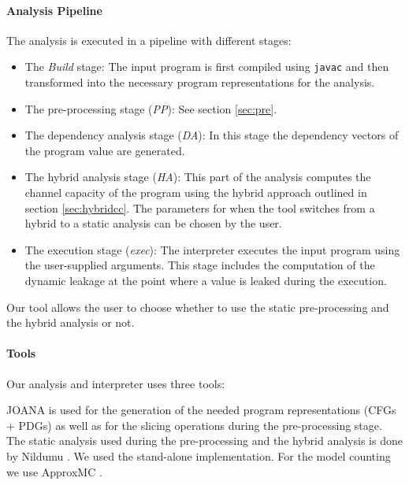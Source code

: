 \paragraph{Analysis Pipeline}
The analysis is executed in a pipeline with different stages:
\begin{itemize}
    \setlength\itemsep{0em}
    \item The \emph{Build} stage: The input program is first compiled using \texttt{javac} and then transformed into the necessary program representations for the analysis.
    \item The pre-processing stage (\emph{PP}): See section \ref{sec:pre}.
    \item The dependency analysis stage (\emph{DA}): In this stage the dependency vectors of the program value are generated.
    \item The hybrid analysis stage (\emph{HA}): This part of the analysis computes the channel capacity of the program using the hybrid approach outlined in section \ref{sec:hybridcc}. The parameters for when the tool switches from a hybrid to a static analysis can be chosen by the user.
    \item The execution stage (\emph{exec}): The interpreter executes the input program using the user-supplied arguments. This stage includes the computation of the dynamic leakage at the point where a value is leaked during the execution.
\end{itemize}
Our tool allows the user to choose whether to use the static pre-processing and the hybrid analysis or not.


\paragraph{Tools}
Our analysis and interpreter uses three tools:

JOANA is used for the generation of the needed program representations (CFGs + PDGs) as well as for the slicing operations during the pre-processing stage. The static analysis used during the pre-processing and the hybrid analysis is done by Nildumu \cite{bechberger18}. We used the stand-alone implementation. For the model counting we use ApproxMC \cite{chakraborty13}.
